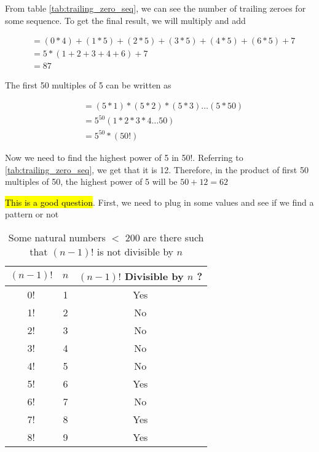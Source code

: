
From table \ref{tab:trailing_zero_seq}, we can see the number of trailing zeroes for some sequence. To get the final result, we will multiply and add

\begin{align*}
    &= (0 * 4) + (1 * 5) + (2 * 5) + (3 * 5) + (4 * 5) + (6 * 5) + 7 \\
    &= 5 * (1 + 2 + 3 + 4 + 6) + 7 \\
    &= 87
\end{align*}


The first 50 multiples of 5 can be written as

\begin{align*}
    &= (5 * 1) * (5 * 2) * (5 * 3) \ldots (5 * 50) \\
    &= 5^{50} (1 * 2 * 3 * 4 \ldots 50) \\
    &= 5^{50} * (50!)
\end{align*}

Now we need to find the highest power of 5 in 50!. Referring to \ref{tab:trailing_zero_seq}, we get that it is 12. Therefore, in the product of first 50 multiples of 50, the highest power of 5 will be $50 + 12 = 62$ 


\hl{This is a good question}. First, we need to plug in some values and see if we find a pattern or not \newpage

\begin{table}[ht!]
    \centering
    \begin{tabular}{|| c | c | c ||}
         \hline
         $(n-1)!$ & $n$ & $(n-1)!$ Divisible by $n$ ?  \\
         \hline
         0! & 1 & Yes \\
         1! & 2 & No \\
         2! & 3 & No \\
         3! & 4 & No \\
         4! & 5 & No \\
         5! & 6 & Yes \\
         6! & 7 & No \\
         7! & 8 & Yes \\
         8! & 9 & Yes \\
         \hline
    \end{tabular}
    \caption{Some natural numbers $<$ 200 are there such that $(n-1)!$ is not divisible by $n$}
\end{table}


